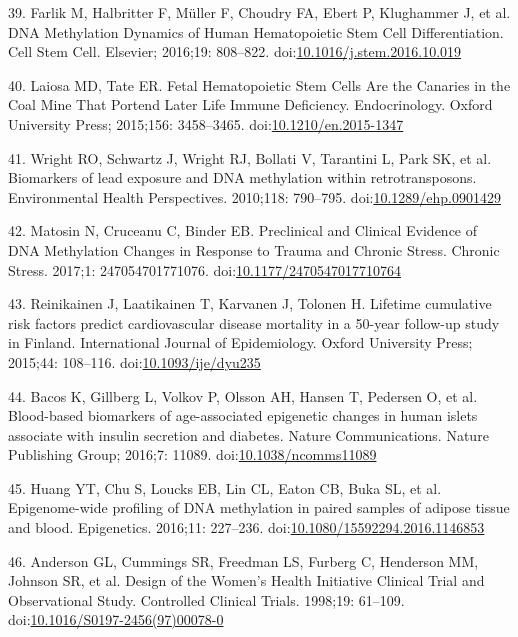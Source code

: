 \documentclass[]{article}
\theoremstyle{definition}
\theoremstyle{definition}
\theoremstyle{definition}
\theoremstyle{remark}
\begin{document}
39. Farlik M, Halbritter F, M{ü}ller F, Choudry FA, Ebert P, Klughammer
J, et al. DNA Methylation Dynamics of Human Hematopoietic Stem Cell
Differentiation. Cell Stem Cell. Elsevier; 2016;19: 808--822.
doi:\href{http://dx.doi.org/10.1016/j.stem.2016.10.019}{10.1016/j.stem.2016.10.019}

40. Laiosa MD, Tate ER. Fetal Hematopoietic Stem Cells Are the Canaries
in the Coal Mine That Portend Later Life Immune Deficiency.
Endocrinology. Oxford University Press; 2015;156: 3458--3465.
doi:\href{http://dx.doi.org/10.1210/en.2015-1347}{10.1210/en.2015-1347}

41. Wright RO, Schwartz J, Wright RJ, Bollati V, Tarantini L, Park SK,
et al. Biomarkers of lead exposure and DNA methylation within
retrotransposons. Environmental Health Perspectives. 2010;118: 790--795.
doi:\href{http://dx.doi.org/10.1289/ehp.0901429}{10.1289/ehp.0901429}

42. Matosin N, Cruceanu C, Binder EB. Preclinical and Clinical Evidence
of DNA Methylation Changes in Response to Trauma and Chronic Stress.
Chronic Stress. 2017;1: 247054701771076.
doi:\href{http://dx.doi.org/10.1177/2470547017710764}{10.1177/2470547017710764}

43. Reinikainen J, Laatikainen T, Karvanen J, Tolonen H. Lifetime
cumulative risk factors predict cardiovascular disease mortality in a
50-year follow-up study in Finland. International Journal of
Epidemiology. Oxford University Press; 2015;44: 108--116.
doi:\href{http://dx.doi.org/10.1093/ije/dyu235}{10.1093/ije/dyu235}

44. Bacos K, Gillberg L, Volkov P, Olsson AH, Hansen T, Pedersen O, et
al. Blood-based biomarkers of age-associated epigenetic changes in human
islets associate with insulin secretion and diabetes. Nature
Communications. Nature Publishing Group; 2016;7: 11089.
doi:\href{http://dx.doi.org/10.1038/ncomms11089}{10.1038/ncomms11089}

45. Huang YT, Chu S, Loucks EB, Lin CL, Eaton CB, Buka SL, et al.
Epigenome-wide profiling of DNA methylation in paired samples of adipose
tissue and blood. Epigenetics. 2016;11: 227--236.
doi:\href{http://dx.doi.org/10.1080/15592294.2016.1146853}{10.1080/15592294.2016.1146853}

46. Anderson GL, Cummings SR, Freedman LS, Furberg C, Henderson MM,
Johnson SR, et al. Design of the Women's Health Initiative Clinical
Trial and Observational Study. Controlled Clinical Trials. 1998;19:
61--109.
doi:\href{http://dx.doi.org/10.1016/S0197-2456(97)00078-0}{10.1016/S0197-2456(97)00078-0}
\end{document}
